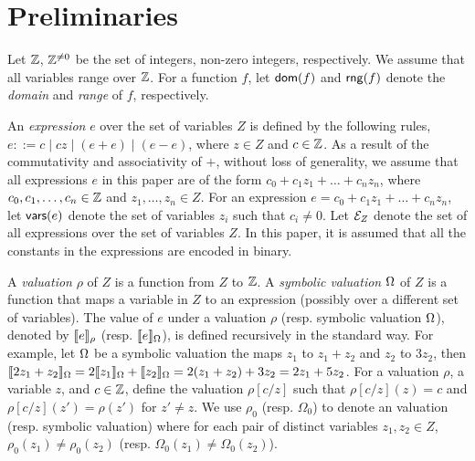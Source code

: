 
\section{Preliminaries}
\label{sec:preliminaries}
Let ${\mathbb{Z} }$,  $\mathbb{Z}^{\neq 0}$ be the set of integers, non-zero integers, respectively.
We assume that all variables range over ${\mathbb{Z} }$.  
For a function $f$, let $\mathsf{dom}(f)$ and $\mathsf{rng}(f)$ denote the \emph{domain}  and \emph{range} of $f$, respectively. 

An \emph{expression} $e$ over the set of variables $Z$ is defined by the following rules, $e::=  c \mid  c z \mid (e + e) \mid (e - e)$, where $z \in Z$ and $c\in {\mathbb{Z} }$.  As a result of the commutativity and associativity of $+$, without loss of generality, we assume that all expressions $e$ in this paper are of the form $c_0 + c_1 z_1 + \dots + c_n z_n$, where $c_0, c_1,\dots,c_n \in {\mathbb{Z} }$ and $z_1,\dots,z_n \in Z$. 
For an expression $e=c_0+c_1 z_1 + \dots + c_n z_n$, let $\mathsf{vars}(e)$ denote the set of variables $z_i$ such that $c_i \neq 0$. Let ${\mathcal{E} }_Z$ denote the set of all expressions over the set of variables $Z$. In this paper, it is assumed that all the constants in the expressions are encoded in binary.


A \emph{valuation} $\rho$ of $Z$ is a function from $Z$ to ${\mathbb{Z} }$. A \emph{symbolic valuation} $\Omega$ of $Z$ is a function that maps a variable in $Z$ to an expression (possibly over a different set of variables). The value of $e$ under a valuation $\rho$ (resp. symbolic valuation $\Omega$), denoted by $\llbracket e\rrbracket_{\rho}$ (resp. $\llbracket e\rrbracket_{\Omega}$), is defined recursively in the standard way. For example, let $\Omega$ be a symbolic valuation the maps $z_1$ to $z_1+z_2$ and $z_2$ to $3z_2$, then $\llbracket2z_1+z_2\rrbracket_{\Omega}=2\llbracket z_1\rrbracket_{\Omega}+\llbracket z_2\rrbracket_{\Omega}=2(z_1+z_2)+3z_2=2z_1+5z_2$.
For a valuation $\rho$, a variable $z$, and $c \in {\mathbb{Z} }$, define the valuation $\rho[c/z]$ such that $\rho[c/z](z)=c$ and $\rho[c/z](z')=\rho(z')$ for $z'\neq z$. 
We use $\rho_0$ (resp. $\Omega_0$) to denote an valuation (resp. symbolic valuation) where for each pair of distinct variables $z_1,z_2 \in Z$, $\rho_0(z_1) \neq \rho_0(z_2)$ (resp. $\Omega_0(z_1) \neq \Omega_0(z_2)$).

